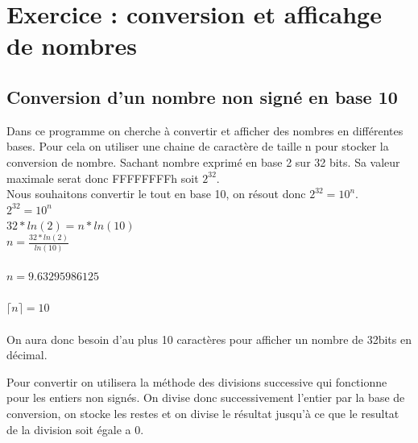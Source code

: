\documentclass[11pt]{report}
\begin{document}
\section{Exercice : conversion et afficahge de nombres}

\subsection{Conversion d'un nombre non signé en base 10}


Dans ce programme on cherche à convertir et afficher des nombres en différentes bases.
Pour cela on utiliser une chaine de caractère de taille n pour stocker la conversion de nombre.
Sachant nombre exprimé en base 2 sur 32 bits. Sa valeur maximale serat donc FFFFFFFFh soit $2^{32}$.
\\ Nous souhaitons convertir le tout en base 10, on résout donc $2^{32}=10^n$.
\\ $2^{32}=10^n$
\\ $32*ln(2) = n*ln(10)$
\\ $n=\frac{32*ln(2)}{ln(10)}$
\\
\\ $n=9.63295986125$
\\
\\ ${\lceil}n{\rceil}=10$
\\
\\ On aura donc besoin d'au plus 10 caractères pour afficher un nombre de 32bits en décimal.

Pour convertir on utilisera la méthode des divisions successive qui fonctionne pour les entiers non signés.
On divise donc successivement l'entier par la base de conversion,
on stocke les restes et on divise le résultat jusqu'à ce que le resultat de la division soit égale a 0.
\end{document}

